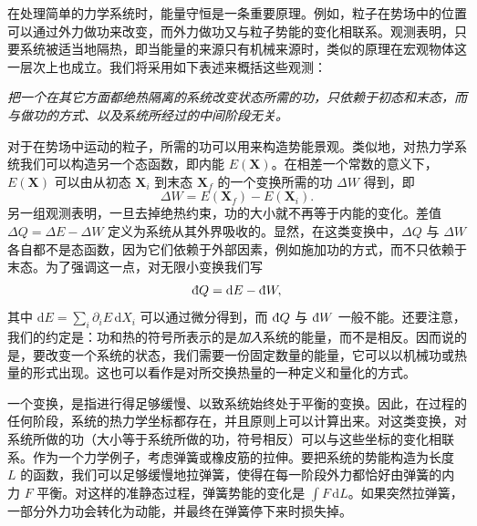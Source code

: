 
在处理简单的力学系统时，能量守恒是一条重要原理。例如，粒子在势场中的位置可以通过外力做功来改变，而外力做功又与粒子势能的变化相联系。观测表明，只要系统被适当地隔热，即当能量的来源只有机械来源时，类似的原理在宏观物体这一层次上也成立。我们将采用如下表述来概括这些观测：

\emph{把一个在其它方面都绝热隔离的系统改变状态所需的功，只依赖于初态和末态，而与做功的方式、以及系统所经过的中间阶段无关。}


对于在势场中运动的粒子，所需的功可以用来构造势能景观。类似地，对热力学系统我们可以构造另一个态函数，即内能 $E(\bm{X})$。在相差一个常数的意义下，
$E(\bm{X})$ 可以由从初态 $\bm{X}_i$ 到末态 $\bm{X}_f$ 的一个变换所需的功 $\Delta W$ 得到，即
\begin{equation}
\Delta W=E(\bm{X}_f)-E(\bm{X}_i).
\label{eq:1.11}
\end{equation}
另一组观测表明，一旦去掉绝热约束，功的大小就不再等于内能的变化。差值 $\Delta Q=\Delta E-\Delta W$ 定义为系统从其外界吸收的。显然，在这类变换中，$\Delta Q$ 与 $\Delta W$ 各自都不是态函数，因为它们依赖于外部因素，例如施加功的方式，而不只依赖于末态。为了强调这一点，对无限小变换我们写
\begin{equation}
\inexd Q=\mathrm{d}E-\inexd W,
\label{eq:1.12}
\end{equation}
其中 $\mathrm{d}E=\sum_i\partial_iE\,\mathrm{d}X_i$ 可以通过微分得到，而 $\inexd Q$ 与 $\inexd W$ 一般不能。还要注意，我们的约定是：功和热的符号所表示的是\emph{加入}系统的能量，而不是相反。因而说的是，要改变一个系统的状态，我们需要一份固定数量的能量，它可以以机械功或热量的形式出现。这也可以看作是对所交换热量的一种定义和量化的方式。

一个变换，是指进行得足够缓慢、以致系统始终处于平衡的变换。因此，在过程的任何阶段，系统的热力学坐标都存在，并且原则上可以计算出来。对这类变换，对系统所做的功（大小等于系统所做的功，符号相反）可以与这些坐标的变化相联系。作为一个力学例子，考虑弹簧或橡皮筋的拉伸。要把系统的势能构造为长度 $L$ 的函数，我们可以足够缓慢地拉弹簧，使得在每一阶段外力都恰好由弹簧的内力 $F$ 平衡。对这样的准静态过程，弹簧势能的变化是 $\int F\,\mathrm{d}L$。如果突然拉弹簧，一部分外力功会转化为动能，并最终在弹簧停下来时损失掉。

